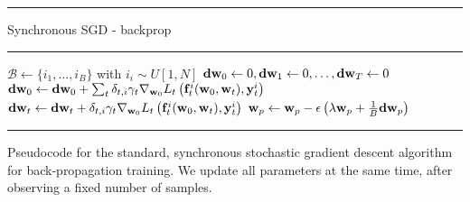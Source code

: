 \documentclass[10pt,twocolumn,letterpaper]{article}
\begin{document}


\newcommand{\bi}{i}
\newcommand{\bs}{B}
\newcommand{\mb}{\mathcal{B}}
\newcommand{\tast}{p}

 \newcommand{\grad}[1]{{\mathrm{\mathbf{d}}#1}}
 \newcommand{\cnt}[1]{\mathrm{\mathbf{c}}_{#1}}
 \newcommand{\setto}{\leftarrow}
 \begin{table}[!t]
 	\hrule
 	\vspace{3pt}
 	Synchronous SGD - backprop
 	\hrule
 	\begin{algorithmic}
 		\STATE {}
 		\STATE  $\mb \setto \{\bi_1,\ldots,\bi_{\bs}\}$ with $\bi_i \sim U[1,N]$ 
 		\STATE {}
 		\STATE $\grad{\prm{\cnn}} \setto 0,\grad{\prm{1}} \setto 0,\ldots,\grad{\prm{T}} \setto 0$  
 		\FOR{$\bi \in \mb$}
 		\STATE {}
 		\STATE $ \grad{\prm{\cnn}} \setto \grad{\prm{\cnn}} + \sum_{\task} \mydelta{\task}{\bi}\gamma_{\task}\lossdd{\task}{\prd{\task}{\bi}(\prm{\cnn},\prm{\task})}{\gt{\task}{\bi}}{\prm{\cnn}}$
 		\STATE {}
 		\STATE $ \grad{\prm{\task}} \setto \grad{\prm{\task}} + \mydelta{\task}{\bi}\gamma_{\task}\lossdd{\task}{\prd{\task}{\bi}(\prm{\cnn},\prm{\task})}{\gt{\task}{\bi}}{\prm{\cnn}}$ 
 		\ENDFOR
 		\FOR{$\tast \in \{\cnn,1,\ldots,T\}$}
 		\STATE $\prm{\tast} \setto \prm{\tast} - \epsilon\left( \lambda  \prm{\tast}   + \frac{1}{\bs}\grad{\prm{\tast}} \right)$
 		\ENDFOR
 		\ENDFOR
 		\vspace{.2cm}
 		\hrule
 	\end{algorithmic}
 	\caption{Pseudocode for the standard, synchronous stochastic gradient descent algorithm for back-propagation training. We update all parameters at the same time, after observing a fixed number of samples. \label{sync}}
 \end{table}
 
\end{document}
